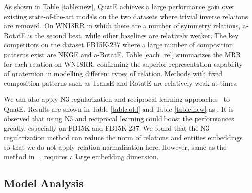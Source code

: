 \documentclass{article}
\begin{document}
As shown in Table \ref{table:new}, QuatE achieves a large performance gain over existing state-of-the-art models on the two datasets where trivial inverse relations are removed. On WN18RR in which there are a number of symmetry relations, a-RotatE is the second best, while other baselines are relatively weaker. The key competitors on the dataset FB15K-237 where a large number of composition patterns exist are NKGE and a-RotatE.  Table \ref{each_rel} summarizes the MRR for each relation on WN18RR, confirming the superior representation  capability of quaternion in modelling different types of relation. Methods with fixed composition patterns such as TransE and RotatE are relatively weak at times.



We can also apply N3 regularization and reciprocal learning approaches~\citep{lacroix2018canonical} to QuatE. Results are shown in Table  \ref{table:old} and Table \ref{table:new} as .  It is observed that using N3 and reciprocal learning could boost the performances greatly, especially on FB15K and FB15K-237. We found that the N3 regularization method can reduce the norm of relations and entities embeddings so that we do not apply relation normalization here. However, same as the method in ~\citep{lacroix2018canonical},  requires a large embedding dimension.




\subsection{Model Analysis}
\end{document}
